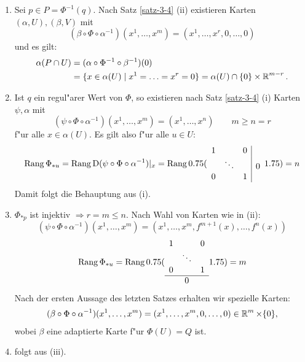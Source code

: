 \begin{bew}\begin{enumerate}[label=(\roman*),widest=iii,leftmargin=*]
\item
	Sei $p \in P = \Phi^{-1}(q)$. Nach Satz \ref{satz-3-4} (ii) existieren Karten $(\alpha,U), (\beta, V)$ mit 
		\[ (\beta \circ \Phi \circ \alpha^{-1})(x^1,\ldots,x^m) = (x^1, \ldots,x^r, 0, \ldots, 0) \]
	und es gilt:
	\begin{align*}
		\alpha(P \cap U) & = (\alpha \circ \Phi^{-1} \circ \beta^{-1})(0) \\
		& = \{x \in \alpha (U) \mid x^1 = \ldots = x^r = 0\} = \alpha(U) \cap \{0\} \times \operatorname{\mathbb{R}}^{m-r}.
	\end{align*} 
\item
	Ist $q$ ein regul"arer Wert von $\Phi$, so existieren nach Satz \ref{satz-3-4} (i) Karten $\psi, \alpha$ mit 
		\[ (\psi \circ \Phi \circ \alpha^{-1})(x^1, \ldots, x^m) = (x^1, \ldots, x^n) \qquad m \geq n = r \]
	f"ur alle $x \in \alpha(U)$. Es gilt also f"ur alle $u \in U$:
	\begin{align*}
		\operatorname{Rang} \Phi_{*u} = \operatorname{Rang} \operatorname{D}(\psi \circ \Phi \circ \alpha^{-1})|_x = \operatorname{Rang}
		0.75(\begin{array}{ccc|c}
			1 &  & 0 & \\
			& \ddots & & 0 \\
			0 & & 1 & 
		\end{array}1.75)
		= n
	\end{align*}
	Damit folgt die Behauptung aus (i).
\item
	$\Phi_{*p}$ ist injektiv $\Rightarrow r = m \leq n$. Nach Wahl von Karten wie in (ii):
		\[ (\psi \circ \Phi \circ \alpha^{-1})(x^1, \ldots, x^m) = (x^1, \ldots, x^m,f^{m+1}(x), \ldots, f^n(x)) \]
		\[\operatorname{Rang} \Phi_{*u} = \operatorname{Rang} 
			0.75( \begin{array}{ccc}
				1 & & 0 \\
				& \ddots &  \\
				0 & & 1 \\
				\hline
				& 0      & 
			\end{array} 1.75)
		= m \]
	Nach der ersten Aussage des letzten Satzes erhalten wir spezielle Karten:
	\begin{align*}
		(\beta \circ \Phi \circ \alpha^{-1})(x^1, \ldots, x^m) = (x^1, \ldots, x^m, 0, \ldots, 0) \in \operatorname{\mathbb{R}}^{m} \times \{0\},
	\end{align*}
	wobei $\beta$ eine adaptierte Karte f"ur $\Phi(U) = Q$ ist.
\item
	folgt aus (iii).
\end{enumerate}\end{bew}


